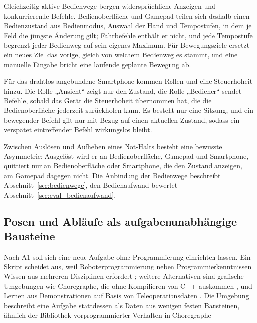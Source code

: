 Gleichzeitig aktive Bedienwege bergen widersprüchliche Anzeigen und konkurrierende Befehle.
Bedienoberfläche und Gamepad teilen sich deshalb einen Bedienzustand aus Bedienmodus, Auswahl der Hand und
Tempostufen, in dem je Feld die jüngste Änderung gilt; Fahrbefehle enthält er nicht, und jede Tempostufe begrenzt
jeder Bedienweg auf sein eigenes Maximum.
Für Bewegungsziele ersetzt ein neues Ziel das vorige, gleich von welchem Bedienweg es stammt, und eine manuelle
Eingabe bricht eine laufende geplante Bewegung ab.

Für das drahtlos angebundene Smartphone kommen Rollen und eine Steuerhoheit hinzu.
Die Rolle „Ansicht“ zeigt nur den Zustand, die Rolle „Bediener“ sendet Befehle, sobald das Gerät die Steuerhoheit
übernommen hat, die die Bedienoberfläche jederzeit zurückholen kann.
Es besteht nur eine Sitzung, und ein bewegender Befehl gilt nur mit Bezug auf einen aktuellen Zustand, sodass ein
verspätet eintreffender Befehl wirkungslos bleibt.

Zwischen Auslösen und Aufheben eines Not-Halts besteht eine bewusste Asymmetrie: Ausgelöst wird er an Bedienoberfläche,
Gamepad und Smartphone, quittiert nur an Bedienoberfläche oder Smartphone, die den Zustand anzeigen, am Gamepad
dagegen nicht.
Die Anbindung der Bedienwege beschreibt Abschnitt~\ref{sec:bedienwege}, den Bedienaufwand bewertet
Abschnitt~\ref{sec:eval_bedienaufwand}.

\subsection{Posen und Abläufe als aufgabenunabhängige Bausteine}
\label{sec:posen_ablaeufe}
Nach A1 soll sich eine neue Aufgabe ohne Programmierung einrichten lassen.
Ein Skript scheidet aus, weil Roboterprogrammierung neben Programmierkenntnissen Wissen aus mehreren Disziplinen
erfordert \cite{Ajaykumar2021}; weitere Alternativen sind grafische Umgebungen wie Choregraphe,
die ohne Kompilieren von C++ auskommen \cite{Pot2009}, und Lernen aus Demonstrationen auf Basis von
Teleoperationsdaten \cite{Cheng2024}.
Die Umgebung beschreibt eine Aufgabe stattdessen als Daten aus wenigen festen Bausteinen, ähnlich der Bibliothek
vorprogrammierter Verhalten in Choregraphe \cite{Pot2009}.

